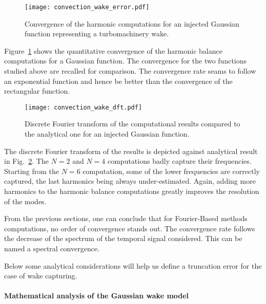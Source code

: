 \begin{figure}[htbp]
  \centering
  \texttt{[image: convection\_wake\_error.pdf]}
  \caption{Convergence of the harmonic computations 
  for an injected Gaussian function representing a turbomachinery wake.}
  \label{fig:conv_wake}
\end{figure}
Figure~\ref{fig:conv_wake} shows the quantitative convergence of 
the harmonic balance computations for a Gaussian function. The
convergence for the two functions studied above are recalled
for comparison.
The convergence rate seams to follow an exponential function
and hence be better than the convergence of the rectangular function.
\begin{figure}[htbp]
  \centering
  \texttt{[image: convection\_wake\_dft.pdf]}
  \caption{Discrete Fourier transform of the computational
  results compared to the analytical one for an injected 
  Gaussian function.}
  \label{fig:dft_wake}
\end{figure}
The discrete Fourier transform of the results is
depicted against analytical result in Fig.~\ref{fig:dft_wake}.
The $N=2$ and $N=4$ computations badly capture their frequencies.
Starting from the  $N=6$ computation, some of the lower 
frequencies are correctly captured, the last harmonics being
always under-estimated.
Again, adding more harmonics to the harmonic balance
computations greatly improves the resolution of the
modes.

From the previous sections, one can conclude that for
Fourier-Based methods computations, no order
of convergence stands out. The convergence rate follows the decrease
of the spectrum of the temporal signal considered.
This can be named a spectral convergence.

Below some analytical considerations will help us
define a truncation error for the case of wake capturing.

\paragraph{Mathematical analysis of the Gaussian wake model}
\label{sec:analytical_considerations}

